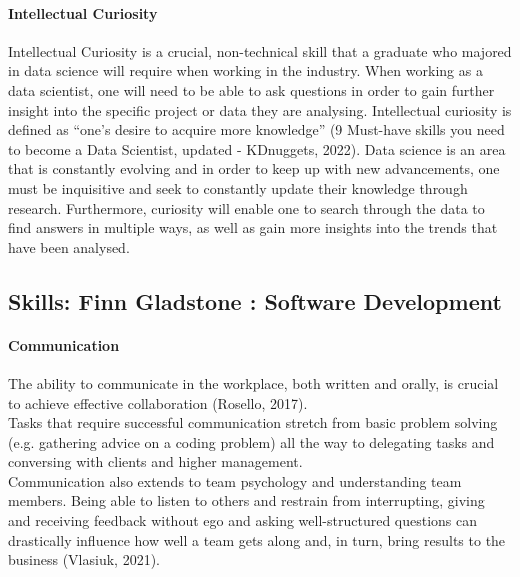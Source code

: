 \documentclass[a4paper, 11pt]{report}
\begin{document}
	\paragraph {Intellectual Curiosity} Intellectual Curiosity is a crucial, non-technical skill that a graduate who majored in data science will require when working in the industry. When working as a data scientist, one will need to be able to ask questions in order to gain further insight into the specific project or data they are analysing. Intellectual curiosity is defined as “one’s desire to acquire more knowledge” (9 Must-have skills you need to become a Data Scientist, updated - KDnuggets, 2022). Data science is an area that is constantly evolving and in order to keep up with new advancements, one must be inquisitive and seek to constantly update their knowledge through research. Furthermore, curiosity will enable one to search through the data to find answers in multiple ways, as well as gain more insights into the trends that have been analysed.

	\subsection{Skills: Finn Gladstone : Software Development}

	\paragraph{Communication} The ability to communicate in the workplace, both written and orally, is crucial to achieve effective collaboration (Rosello, 2017).
	\\Tasks that require successful communication stretch from basic problem solving (e.g. gathering advice on a coding problem) all the way to delegating tasks and conversing with clients and higher management.
	\\Communication also extends to team psychology and understanding team members. Being able to listen to others and restrain from interrupting, giving and receiving feedback without ego and asking well-structured questions can drastically influence how well a team gets along and, in turn, bring results to the business (Vlasiuk, 2021).
\end{document}
